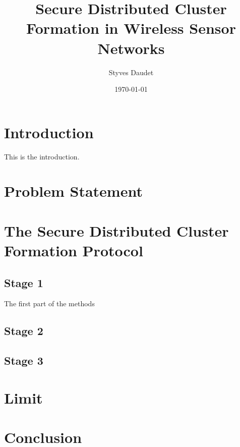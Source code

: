 \documentclass{article}
\author{}
\begin{document}
  
	\title{Secure Distributed Cluster Formation in Wireless Sensor Networks}
	\author{Styves Daudet }
	\date{\today}
	\maketitle
	
	\section{Introduction}
		This is the introduction.
	\section{ Problem Statement}
	
	\section{ The Secure Distributed Cluster Formation Protocol}
	
		\subsection{Stage 1}
			The first part of the methods
		\subsection{Stage 2}
		\subsection{Stage 3}
	\section{Limit}
	\section*{Conclusion}
\end{document}
